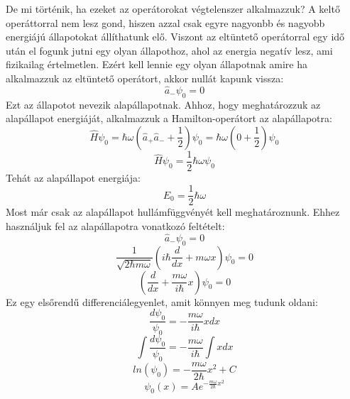 \documentclass[../main.tex]{subfiles}
\begin{document}
De mi történik, ha ezeket az operátorokat végtelenszer alkalmazzuk? A keltő operáttorral nem lesz gond, hiszen azzal csak egyre nagyonbb és nagyobb
energiájú állapotokat állíthatunk elő. Viszont az eltüntető operátorral egy idő után el fogunk jutni egy olyan állapothoz, ahol az energia negatív lesz,
ami fizikailag értelmetlen. Ezért kell lennie egy olyan állapotnak amire ha alkalmazzuk az eltüntető operátort, akkor nullát kapunk vissza:
\begin{equation}
    \hat{a}_- \psi_0 = 0
\end{equation}
Ezt az állapotot nevezik alapállapotnak. Ahhoz, hogy meghatározzuk az alapállapot energiáját, alkalmazzuk a Hamilton-operátort az alapállapotra:
\begin{equation}
    \hat{H} \psi_0 = \hbar \omega \left( \hat{a}_+ \hat{a}_- + \frac{1}{2} \right) \psi_0 = \hbar \omega \left( 0 + \frac{1}{2} \right) \psi_0
\end{equation}
\begin{equation}
    \hat{H} \psi_0 = \frac{1}{2} \hbar \omega \psi_0
\end{equation}
Tehát az alapállapot energiája:
\begin{equation}
    E_0 = \frac{1}{2} \hbar \omega
\end{equation}
Most már csak az alapállapot hullámfüggvényét kell meghatároznunk. Ehhez használjuk fel az alapállapotra vonatkozó feltételt:
\begin{equation}
    \hat{a}_- \psi_0 = 0
\end{equation}
\begin{equation}
    \frac{1}{\sqrt{2 \hbar m \omega}} \left( i \hbar \frac{d}{dx} + m \omega x \right) \psi_0 = 0
\end{equation}
\begin{equation}
    \left( \frac{d}{dx} + \frac{m \omega}{i \hbar} x \right) \psi_0 = 0
\end{equation}
Ez egy elsőrendű differenciálegyenlet, amit könnyen meg tudunk oldani:
\begin{equation}
    \frac{d \psi_0}{\psi_0} = - \frac{m \omega}{i \hbar} x dx
\end{equation}
\begin{equation}
    \int \frac{d \psi_0}{\psi_0} = - \frac{m \omega}{i \hbar} \int x dx
\end{equation}
\begin{equation}
    ln(\psi_0) = - \frac{m \omega}{2 \hbar} x^2 + C
\end{equation}
\begin{equation}
    \psi_0(x) = A e^{- \frac{m \omega}{2 \hbar} x^2}
\end{equation}
\end{document}
